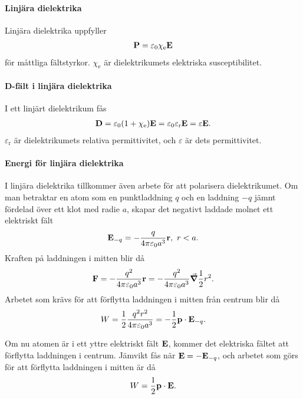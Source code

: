 \paragraph{Linjära dielektrika}
Linjära dielektrika uppfyller
\begin{align*}
	\vb{P} = \varepsilon_{0}\chi_{\text{e}}\vb{E}
\end{align*}
för måttliga fältstyrkor. $\chi_{\text{e}}$ är dielektrikumets elektriska susceptibilitet.

\paragraph{D-fält i linjära dielektrika}
I ett linjärt dielektrikum fås
\begin{align*}
	\vb{D} = \varepsilon_{0}(1 + \chi_{\text{e}})\vb{E} = \varepsilon_{0}\varepsilon_{\text{r}}\vb{E} = \varepsilon\vb{E}.
\end{align*}
$\varepsilon_{\text{r}}$ är dielektrikumets relativa permittivitet, och $\varepsilon$ är dets permittivitet.

\paragraph{Energi för linjära dielektrika}
I linjära dielektrika tillkommer även arbete för att polarisera dielektrikumet. Om man betraktar en atom som en punktladdning $q$ och en laddning $-q$ jämnt fördelad över ett klot med radie $a$, skapar det negativt laddade molnet ett elektriskt fält
\begin{align*}
	\vb{E}_{-q} = -\frac{q}{4\pi\varepsilon_{0}a^{3}}\vb{r},\ r < a.
\end{align*}
Kraften på laddningen i mitten blir då
\begin{align*}
	\vb{F} = -\frac{q^{2}}{4\pi\varepsilon_{0}a^{3}}\vb{r} = -\frac{q^{2}}{4\pi\varepsilon_{0}a^{3}}\grad{\frac{1}{2}r^{2}}.
\end{align*}
Arbetet som krävs för att förflytta laddningen i mitten från centrum blir då
\begin{align*}
	W = \frac{1}{2}\frac{q^{2}r^{2}}{4\pi\varepsilon_{0}a^{3}} = -\frac{1}{2}\vb{p}\cdot\vb{E}_{-q}.
\end{align*}

Om nu atomen är i ett yttre elektriskt fält $\vb{E}$, kommer det elektriska fältet att förflytta laddningen i centrum. Jämvikt fås när $\vb{E} = -\vb{E}_{-q}$, och arbetet som görs för att förflytta laddningen i mitten är då
\begin{align*}
	W = \frac{1}{2}\vb{p}\cdot\vb{E}.
\end{align*}


